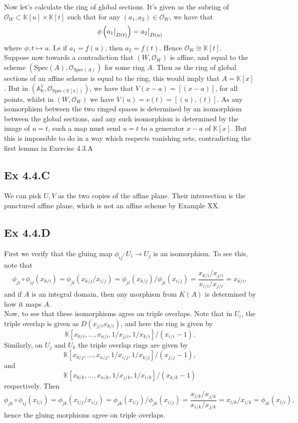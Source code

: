 \documentclass{article}
\newcommand\restr[2]{{%
  \left.\kern-\nulldelimiterspace %
  #1 %
  \vphantom{\big|} %
  \right|_{#2} %
  }}
\theoremstyle{definition}
\newcommand{\K}{\mathbb{K}}
\newcommand{\A}{\mathbb{A}}
\newcommand{\oo}{\mathcal{O}}
\newcommand{\osp}[1]{\oo_{\Spec\left(#1\right)}}
\renewcommand{\AA}[1]{\A^{#1}}
\newcommand{\Spec}{\text{Spec}}
\begin{document}
Now let's calculate the ring of global sections. It's given as the subring of
$\oo_W \subset \K[u] \times \K[t]$ such that for any $(a_1, a_2) \in
\oo_W$, we have that 
\[
	\phi\left(\restr{a_1}{D(t)}\right)
	=
	\restr{a_2}{D(u)}
\] 
where $\phi : t \mapsto u$. I.e if $a_1 = f(u)$, then $a_2 = f(t)$. Hence
$\oo_W \cong \K[t]$. \\

Suppose now towards a contradiction that $(W, \oo_W)$ is affine, and equal to
the scheme $(\Spec(A), \osp{A})$ for some ring $A$. Then as the ring of global
sections of an affine scheme is equal to the ring, this would imply that $A =
\K[x]$. But in $(\AA{1}_{\K}, \osp{\K[x]})$, we have that $V(x - a) = [(x -
a)]$, for all points, whilst in $(W, \oo_W)$ we have $V(u) = v(t) = [(u),
(t)]$. As any isomorphism between the two ringed spaces is determined by an
isomorphism between the global sections, and any such isomorphism is determined
by the image of $u = t$, such a map must send $u = t$ to a generator $x - a$ of
$\K[x]$. But this is impossible to do in a way which respects vanishing sets,
contradicting the first lemma in Exercise 4.3.A

\subsection*{Ex 4.4.C}

We can pick $U, V$ as the two copies of the affine plane. Their intersection is
the punctured affine plane, which is not an affine scheme by Example XX.

\subsection*{Ex 4.4.D}

First we verify that the gluing map $\phi_{ij} : U_i \to U_j$ is an isomorphism.
To see this, note that
\[
	\phi_{ji} \circ \phi_{ij} (x_{k/i})
	=
	\phi_{ji}(x_{k/j}/x_{i/j})
	=
	\phi_{ji}(x_{k/j})/\phi_{ji}(x_{i/j})
	=
	\frac{x_{k/i}/x_{j/i}}{x_{i/i}/x_{j/i}}
	=
	x_{k/i},
\]
and if $A$ is an integral domain, then any morphism from $K(A)$ is determined
by how it maps $A$. \\

Now, to see that these isomorphisms agree on triple overlaps. Note that 
in $U_i$, the triple overlap is given as $D(x_{j/i}x_{k/i})$,
and here the ring is given by
\[
	\K[x_{0/i}, \ldots, x_{n/i}, 1/x_{j/i}, 1/x_{k/i}]/(x_{i/i} - 1).
\]
Similarly, on $U_j$ and $U_k$ the triple overlap rings are given by
\[
	\K[x_{0/j}, \ldots, x_{n/j}, 1/x_{i/j}, 1/x_{k/j}]/(x_{j/j} - 1),
\]
and
\[
	\K[x_{0/k}, \ldots, x_{n/k}, 1/x_{j/k}, 1/x_{i/k}]/(x_{k/k} - 1)
\]
respectively. Then
\[
	\phi_{jk} \circ \phi_{ij} (x_{l/i})
	=
	\phi_{jk}(x_{l/j}/x_{i/j})
	=
	\phi_{jk}(x_{l/j})/\phi_{jk}(x_{i/j})
	=
	\frac{x_{l/k}/x_{j/k}}{x_{i/k}/x_{j/k}}
	=
	x_{l/k}/x_{i/k}
	=
	\phi_{ik}(x_{l/i}),
\]
hence the gluing morphisms agree on triple overlaps.
\end{document}
